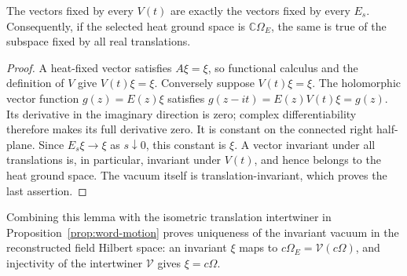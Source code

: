 \begin{lemma}\label{lem:time-fixed-heat}
The vectors fixed by every $V(t)$ are exactly the vectors fixed by every
$E_s$. Consequently, if the selected heat ground space is
$\mathbb C\Omega_E$, the same is true of the subspace fixed by all real
translations.
\end{lemma}
\begin{proof}
A heat-fixed vector satisfies $A\xi=\xi$, so functional calculus and the
definition of $V$ give $V(t)\xi=\xi$. Conversely suppose $V(t)\xi=\xi$.
The holomorphic vector function $g(z)=E(z)\xi$ satisfies
$g(z-it)=E(z)V(t)\xi=g(z)$. Its derivative in the imaginary direction is
zero; complex differentiability therefore makes its full derivative zero.
It is constant on the connected right half-plane. Since
$E_s\xi\to\xi$ as $s\downarrow0$, this constant is $\xi$.
A vector invariant under all translations is, in particular, invariant under
$V(t)$, and hence belongs to the heat ground space. The vacuum itself is
translation-invariant, which proves the last assertion.
\end{proof}

Combining this lemma with the isometric translation intertwiner in
Proposition~\ref{prop:word-motion} proves uniqueness of the invariant vacuum
in the reconstructed field Hilbert space: an invariant $\xi$ maps to
$c\Omega_E=\mathcal V(c\Omega)$, and injectivity of the intertwiner
$\mathcal V$ gives $\xi=c\Omega$.
